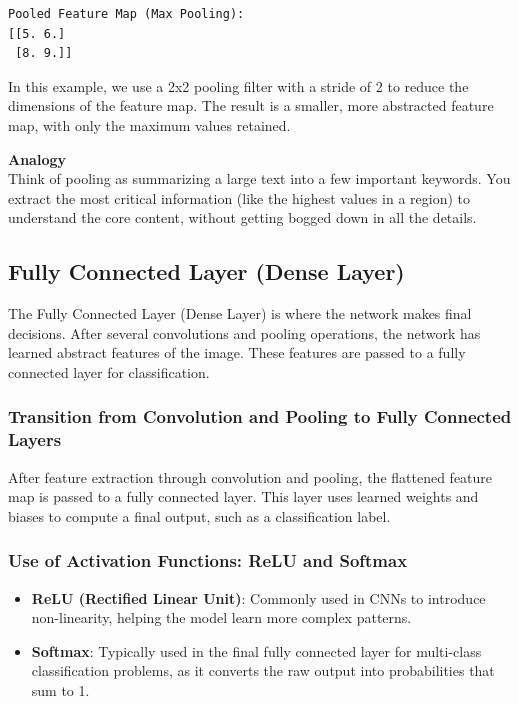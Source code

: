 \documentclass[
  letterpaper,
  DIV=11,
  numbers=noendperiod]{scrreprt}
\providecommand{\tightlist}{%
  \setlength{\itemsep}{0pt}\setlength{\parskip}{0pt}}\usepackage{longtable,booktabs,array}
\begin{document}
\begin{verbatim}
Pooled Feature Map (Max Pooling):
[[5. 6.]
 [8. 9.]]
\end{verbatim}

In this example, we use a 2x2 pooling filter with a stride of 2 to
reduce the dimensions of the feature map. The result is a smaller, more
abstracted feature map, with only the maximum values retained.

\textbf{Analogy}\\
Think of pooling as summarizing a large text into a few important
keywords. You extract the most critical information (like the highest
values in a region) to understand the core content, without getting
bogged down in all the details.

\subsection{Fully Connected Layer (Dense
Layer)}\label{fully-connected-layer-dense-layer}

The Fully Connected Layer (Dense Layer) is where the network makes final
decisions. After several convolutions and pooling operations, the
network has learned abstract features of the image. These features are
passed to a fully connected layer for classification.

\subsubsection{Transition from Convolution and Pooling to Fully
Connected
Layers}\label{transition-from-convolution-and-pooling-to-fully-connected-layers}

After feature extraction through convolution and pooling, the flattened
feature map is passed to a fully connected layer. This layer uses
learned weights and biases to compute a final output, such as a
classification label.

\subsubsection{Use of Activation Functions: ReLU and
Softmax}\label{use-of-activation-functions-relu-and-softmax}

\begin{itemize}
\tightlist
\item
  \textbf{ReLU (Rectified Linear Unit)}: Commonly used in CNNs to
  introduce non-linearity, helping the model learn more complex
  patterns.
\item
  \textbf{Softmax}: Typically used in the final fully connected layer
  for multi-class classification problems, as it converts the raw output
  into probabilities that sum to 1.
\end{itemize}
\end{document}
